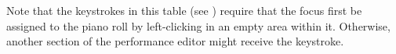 
   Note that the keystrokes in this table
   (see )
   require that the focus first be
   assigned to the piano roll by left-clicking in an empty area within it.
   Otherwise, another section of the performance editor might receive the
   keystroke.

